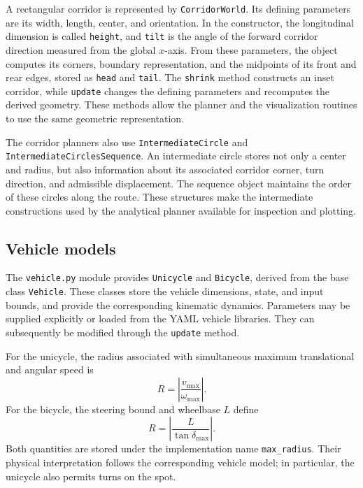 A rectangular corridor is represented by \texttt{CorridorWorld}. Its defining
parameters are its width, length, center, and orientation. In the constructor,
the longitudinal dimension is called \texttt{height}, and \texttt{tilt} is the
angle of the forward corridor direction measured from the global $x$-axis.
From these parameters, the object computes its corners, boundary representation,
and the midpoints of its front and rear edges, stored as \texttt{head} and
\texttt{tail}. The \texttt{shrink} method constructs an inset corridor, while
\texttt{update} changes the defining parameters and recomputes the derived
geometry. These methods allow the planner and the visualization routines to use
the same geometric representation.

The corridor planners also use \texttt{IntermediateCircle} and
\texttt{IntermediateCirclesSequence}. An intermediate circle stores not only a
center and radius, but also information about its associated corridor corner,
turn direction, and admissible displacement. The sequence object maintains the
order of these circles along the route. These structures make the intermediate
constructions used by the analytical planner available for inspection and
plotting.

\subsection{Vehicle models}

The \texttt{vehicle.py} module provides \texttt{Unicycle} and \texttt{Bicycle},
derived from the base class \texttt{Vehicle}. These classes store the vehicle
dimensions, state, and input bounds, and provide the corresponding kinematic
dynamics. Parameters may be supplied explicitly or loaded from the YAML vehicle
libraries. They can subsequently be modified through the \texttt{update} method.

For the unicycle, the radius associated with simultaneous maximum translational
and angular speed is
\begin{equation}
  R=\left|\frac{v_{\max}}{\omega_{\max}}\right|.
\end{equation}
For the bicycle, the steering bound and wheelbase $L$ define
\begin{equation}
  R=\left|\frac{L}{\tan\delta_{\max}}\right|.
\end{equation}
Both quantities are stored under the implementation name \texttt{max\_radius}.
Their physical interpretation follows the corresponding vehicle model; in
particular, the unicycle also permits turns on the spot.

